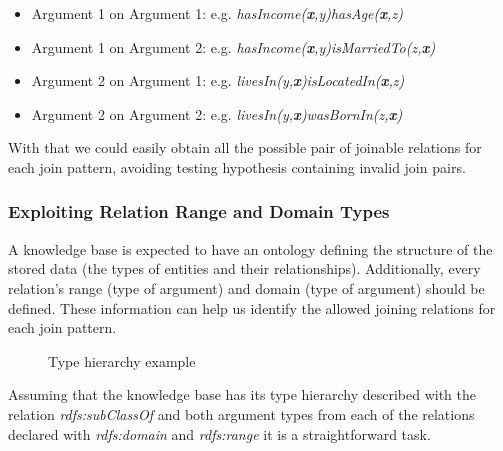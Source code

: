 \begin{itemize}
 \item Argument 1 on Argument 1: e.g. \emph{hasIncome(\textbf{x},y)hasAge(\textbf{x},z)}
 \item Argument 1 on Argument 2: e.g. \emph{hasIncome(\textbf{x},y)isMarriedTo(z,\textbf{x})}
 \item Argument 2 on Argument 1: e.g. \emph{livesIn(y,\textbf{x})isLocatedIn(\textbf{x},z)}
 \item Argument 2 on Argument 2: e.g. \emph{livesIn(y,\textbf{x})wasBornIn(z,\textbf{x})}
\end{itemize}

With that we could easily obtain all the possible pair of joinable relations for each join pattern, avoiding testing
hypothesis containing invalid join pairs.

\subsubsection{Exploiting Relation Range and Domain Types}

A knowledge base is expected to have an ontology defining the structure of the stored data (the types of entities and
their relationships). Additionally, every relation's range (type of  argument) and domain (type of 
argument) should be defined. These information can help us identify the allowed joining relations for each join pattern.

\begin{figure}[!h]
  \caption{Type hierarchy example}
  \centering

\label{fig:typeHierarchy}
\end{figure}

Assuming that the knowledge base has its type hierarchy described with the relation \emph{rdfs:subClassOf} and both
argument types from each of the relations declared with \emph{rdfs:domain} and \emph{rdfs:range} it is a
straightforward task.

